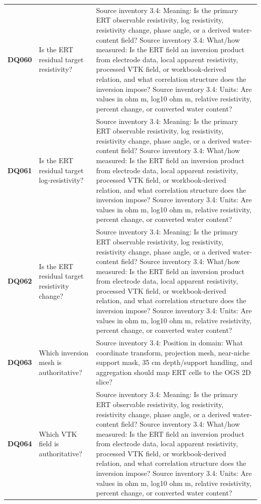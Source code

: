\begin{longtable}{@{}L{0.09\textwidth} L{0.31\textwidth} L{0.52\textwidth}@{}}
\addlinespace[0.18em]
\textbf{DQ060} & Is the ERT residual target resistivity? & Source inventory 3.4: Meaning: Is the primary ERT observable resistivity, log resistivity, resistivity change, phase angle, or a derived water-content field? Source inventory 3.4: What/how measured: Is the ERT field an inversion product from electrode data, local apparent resistivity, processed VTK field, or workbook-derived relation, and what correlation structure does the inversion impose? Source inventory 3.4: Units: Are values in ohm m, log10 ohm m, relative resistivity, percent change, or converted water content?\\
\addlinespace[0.18em]
\textbf{DQ061} & Is the ERT residual target log-resistivity? & Source inventory 3.4: Meaning: Is the primary ERT observable resistivity, log resistivity, resistivity change, phase angle, or a derived water-content field? Source inventory 3.4: What/how measured: Is the ERT field an inversion product from electrode data, local apparent resistivity, processed VTK field, or workbook-derived relation, and what correlation structure does the inversion impose? Source inventory 3.4: Units: Are values in ohm m, log10 ohm m, relative resistivity, percent change, or converted water content?\\
\addlinespace[0.18em]
\textbf{DQ062} & Is the ERT residual target resistivity change? & Source inventory 3.4: Meaning: Is the primary ERT observable resistivity, log resistivity, resistivity change, phase angle, or a derived water-content field? Source inventory 3.4: What/how measured: Is the ERT field an inversion product from electrode data, local apparent resistivity, processed VTK field, or workbook-derived relation, and what correlation structure does the inversion impose? Source inventory 3.4: Units: Are values in ohm m, log10 ohm m, relative resistivity, percent change, or converted water content?\\
\addlinespace[0.18em]
\textbf{DQ063} & Which inversion mesh is authoritative? & Source inventory 3.4: Position in domain: What coordinate transform, projection mesh, near-niche support mask, 35 cm depth/support handling, and aggregation should map ERT cells to the OGS 2D slice?\\
\addlinespace[0.18em]
\textbf{DQ064} & Which VTK field is authoritative? & Source inventory 3.4: Meaning: Is the primary ERT observable resistivity, log resistivity, resistivity change, phase angle, or a derived water-content field? Source inventory 3.4: What/how measured: Is the ERT field an inversion product from electrode data, local apparent resistivity, processed VTK field, or workbook-derived relation, and what correlation structure does the inversion impose? Source inventory 3.4: Units: Are values in ohm m, log10 ohm m, relative resistivity, percent change, or converted water content?\\

\end{longtable}
